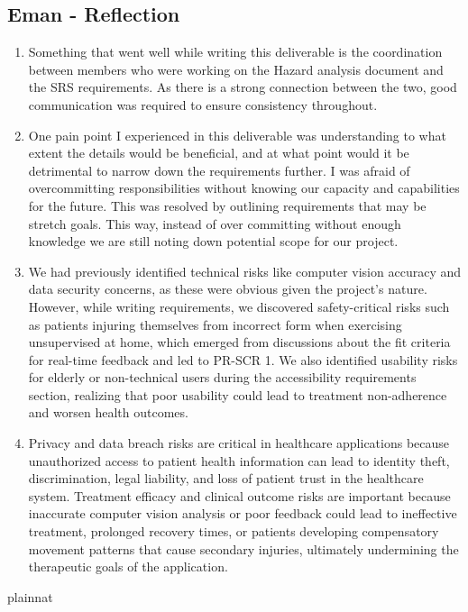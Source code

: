 \documentclass{article}
\begin{document}
\subsection*{Eman - Reflection}
\begin{enumerate}
    \item Something that went well while writing this deliverable is the coordination between members who were working on the Hazard analysis document and the SRS requirements. As there is a strong connection between the two, good communication was required to ensure consistency throughout. 
    \item One pain point I experienced in this deliverable was understanding to what extent the details would be beneficial, and at what point would it be detrimental to narrow down the requirements further. I was afraid of overcommitting responsibilities without knowing our capacity and capabilities for the future. This was resolved by outlining requirements that may be stretch goals. This way, instead of over committing without enough knowledge we are still noting down potential scope for our project. 
    \item We had previously identified technical risks like computer vision accuracy and data security concerns, as these were obvious given the project's nature. However, while writing requirements, we discovered safety-critical risks such as patients injuring themselves from incorrect form when exercising unsupervised at home, which emerged from discussions about the fit criteria for real-time feedback and led to PR-SCR 1. We also identified usability risks for elderly or non-technical users during the accessibility requirements section, realizing that poor usability could lead to treatment non-adherence and worsen health outcomes.
    \item Privacy and data breach risks are critical in healthcare applications because unauthorized access to patient health information can lead to identity theft, discrimination, legal liability, and loss of patient trust in the healthcare system. Treatment efficacy and clinical outcome risks are important because inaccurate computer vision analysis or poor feedback could lead to ineffective treatment, prolonged recovery times, or patients developing compensatory movement patterns that cause secondary injuries, ultimately undermining the therapeutic goals of the application.
\end{enumerate}

 {plainnat}

\end{document}
